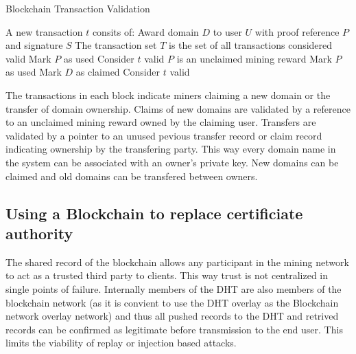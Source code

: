 \documentclass[11pt]{IEEEtran} %
\begin{document}
\begin{algorithm}
\caption{Blockchain Transaction Validation}
\label{validation}
\begin{algorithmic}[1]  %
\STATE A new transaction $t$ consits of: Award domain $D$ to user $U$ with proof reference $P$ and signature $S$
\STATE The transaction set $T$ is the set of all transactions considered valid
    		\STATE Mark $P$ as used
            \STATE Consider $t$ valid
        \ELSE
            	\STATE $P$ is an unclaimed mining reward
                	\STATE Mark $P$ as used
                    \STATE Mark $D$ as claimed
                    \STATE Consider $t$ valid
                \ENDIF
			\ENDIF
         \ENDIF
    \ENDIF
\ENDIF
\end{algorithmic}
\end{algorithm}

The transactions in each block indicate miners claiming a new domain or the transfer of domain ownership. Claims of new domains are validated by a reference to an unclaimed mining reward owned by the claiming user. Transfers are validated by a pointer to an unused pevious transfer record or claim record indicating ownership by the transfering party. This way every domain name in the system can be associated with an owner's private key. New domains can be claimed and old domains can be transfered between owners.






\subsection{Using a Blockchain to replace certificiate authority}
The shared record of the blockchain allows any participant in the mining network to act as a trusted third party to clients. This way trust is not centralized in single points of failure. Internally members of the DHT are also members of the blockchain network (as it is convient to use the DHT overlay as the Blockchain network overlay network) and thus all pushed records to the DHT and retrived records can be confirmed as legitimate before transmission to the end user. This limits the viability of replay or injection based attacks.
\end{document}
